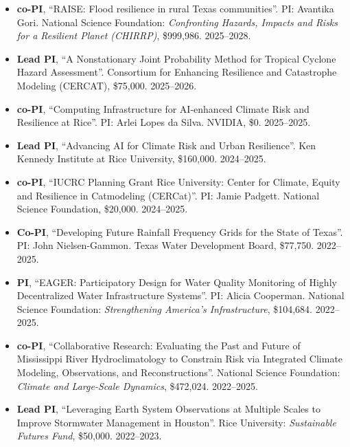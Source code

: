 \documentclass[10pt,oneside]{article}
\begin{document}
\begin{itemize}[label={}]
  
  \item \textbf{co-PI}, \enquote{RAISE: Flood resilience in rural Texas communities}.  PI: Avantika Gori. National Science Foundation: \textit{Confronting Hazards, Impacts and Risks for a Resilient Planet (CHIRRP)}, \$999,986. 2025--2028.
        
  \item \textbf{Lead PI}, \enquote{A Nonstationary Joint Probability Method for Tropical Cyclone Hazard Assessment}.  Consortium for Enhancing Resilience and Catastrophe Modeling (CERCAT), \$75,000. 2025--2026.
        
  \item \textbf{co-PI}, \enquote{Computing Infrastructure for AI-enhanced Climate Risk and Resilience at Rice}.  PI: Arlei Lopes da Silva. NVIDIA, \$0. 2025--2025.
        
  \item \textbf{Lead PI}, \enquote{Advancing AI for Climate Risk and Urban Resilience}.  Ken Kennedy Institute at Rice University, \$160,000. 2024--2025.
        
  \item \textbf{co-PI}, \enquote{IUCRC Planning Grant Rice University: Center for Climate, Equity and Resilience in Catmodeling (CERCat)}.  PI: Jamie Padgett. National Science Foundation, \$20,000. 2024--2025.
        
  \item \textbf{Co-PI}, \enquote{Developing Future Rainfall Frequency Grids for the State of Texas}.  PI: John Nielsen-Gammon. Texas Water Development Board, \$77,750. 2022--2025.
        
  \item \textbf{PI}, \enquote{EAGER: Participatory Design for Water Quality Monitoring of Highly Decentralized Water Infrastructure Systems}.  PI: Alicia Cooperman. National Science Foundation: \textit{Strengthening America's Infrastructure}, \$104,684. 2022--2025.
        
  \item \textbf{co-PI}, \enquote{Collaborative Research: Evaluating the Past and Future of Mississippi River Hydroclimatology to Constrain Risk via Integrated Climate Modeling, Observations, and Reconstructions}.  National Science Foundation: \textit{Climate and Large-Scale Dynamics}, \$472,024. 2022--2025.
        
  \item \textbf{Lead PI}, \enquote{Leveraging Earth System Observations at Multiple Scales to Improve Stormwater Management in Houston}.  Rice University: \textit{Sustainable Futures Fund}, \$50,000. 2022--2023.
        

\end{itemize}
\end{document}
